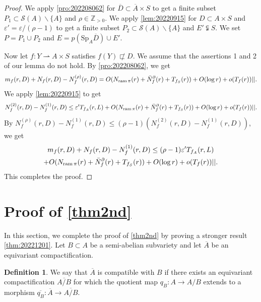 \documentclass[11pt,english]{smfart}
\theoremstyle{plain}
\theoremstyle{definition}
\newtheorem{dfn}[thm]{Definition}
\theoremstyle{remark}
\numberwithin{equation}{section}
\theoremstyle{plain}
\newcommand{\da}{\rightharpoonup}
\newcommand{\pN}[1]{\bar{N}_{#1}^{\partial}}
\newcommand{\ram}{{\rm ram}\,}
\begin{document}
	
	\begin{proof}
		We apply \cref{pro:202208062} for $\overline{D}\subset \overline{A}\times S$ to get a finite subset $P_1\subset \mathcal{S}(A)\backslash\{A\}$ and $\rho\in\mathbb Z_{>0}$.
		We apply \cref{lem:20220915} for $D\subset A\times S$ and $\varepsilon'=\varepsilon/(\rho-1)$ to get a finite subset $P_2\subset \mathcal{S}(A)\backslash\{A\}$ and $E'\subsetneqq S$.
		We set $P=P_1\cup P_2$ and $E=p(\mathrm{Sp}_A\overline{D})\cup E'$.
		
		
		
		
		
		Now let $f:Y\da A\times S$ satisfies $f(Y)\not\sqsubset D$.
		We assume that the assertions 1 and 2 of our lemma do not hold.
		By \cref{pro:202208062}, we get
		\begin{equation*}
			m_f(r,D)+N_f(r,D)-N^{(\rho)}_f(r,D)=O(N_{\ram\pi}(r)
			+\pN{f}(r)+T_{f_S}(r))+O(\log r)+o(T_f(r))||.
		\end{equation*}
		We apply \cref{lem:20220915} to get
		$$N^{(2)}_f(r,D)-N^{(1)}_f(r,D)\leq \varepsilon' T_{f_A}(r,L)+O(N_{\ram\pi}(r)+\pN{f}(r)
		+T_{f_S}(r))+O(\log r)+o(T_f(r))||.$$
		By $N^{(\rho)}_f(r,D)-N^{(1)}_f(r,D)\leq (\rho-1) (N^{(2)}_f(r,D)-N^{(1)}_f(r,D))$, we get
		\begin{multline}\label{eqn:20220915}
			m_f(r,D)+N_f(r,D)-N^{(1)}_f(r,D)\leq (\rho-1)\varepsilon'T_{f_A}(r,L)
			\\
			+
			O(N_{\ram\pi}(r)+\pN{f}(r)
			+T_{f_S}(r))+O(\log r)+o(T_f(r))||.
		\end{multline}
		This completes the proof.
	\end{proof}
	
	
	
	
	\section{Proof of \cref{thm2nd}} 
	\label{subsec:4.7}
	
	
	In this section, we complete the proof of \cref{thm2nd} by proving a stronger result \cref{thm:20221201}.
	Let $B\subset A$ be a semi-abelian subvariety and let
	$\overline{A}$ be an equivariant compactification.
	
	\begin{dfn}
		We say that $\overline{A}$ is compatible with $B$ if there exists an equivariant compactification $\overline{A/B}$ for which the quotient map $q_{B}:A\to A/B$ extends to a morphism $\overline{q_B}:\overline{A}\to \overline{A/B}$.
	\end{dfn}
	
\end{document}
